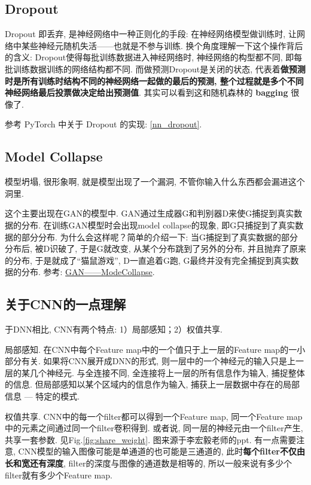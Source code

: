 \subsection{Dropout}
Dropout 即丢弃, 是神经网络中一种正则化的手段: 在神经网络模型做训练时, 让网络中某些神经元随机失活——也就是不参与训练. 换个角度理解一下这个操作背后的含义: Dropout使得每批训练数据进入神经网络时, 神经网络的构型都不同, 即每批训练数据训练的网络结构都不同. 而做预测Dropout是关闭的状态, 代表着\textbf{做预测时是所有训练时结构不同的神经网络一起做的最后的预测, 整个过程就是多个不同神经网络最后投票做决定给出预测值}. 其实可以看到这和随机森林的 \textbf{bagging} 很像了. 

参考 PyTorch 中关于 Dropout 的实现: \ref{nn_dropout}. 

\subsection{Model Collapse}
模型坍塌, 很形象啊, 就是模型出现了一个漏洞, 不管你输入什么东西都会漏进这个洞里. 

这个主要出现在GAN的模型中. GAN通过生成器G和判别器D来使G捕捉到真实数据的分布. 在训练GAN模型时会出现model collapse的现象, 即G只捕捉到了真实数据的部分分布. 为什么会这样呢？简单的介绍一下: 当G捕捉到了真实数据的部分分布后, 被D识破了, 于是G就改变, 从某个分布跳到了另外的分布, 并且抛弃了原来的分布, 于是就成了“猫鼠游戏”, D一直追着G跑, G最终并没有完全捕捉到真实数据的分布. 参考: \href{https://blog.csdn.net/SPARKKKK/article/details/72598041}{GAN——ModeCollapse}. 


\subsection{关于CNN的一点理解}
于DNN相比, CNN有两个特点: 1）局部感知；2）权值共享. 

局部感知. 在CNN中每个Feature map中的一个值只于上一层的Feature map的一小部分有关. 如果将CNN展开成DNN的形式, 则一层中的一个神经元的输入只是上一层的某几个神经元. 与全连接不同, 全连接将上一层的所有信息作为输入, 捕捉整体的信息. 但局部感知以某个区域内的信息作为输入, 捕获上一层数据中存在的局部信息 --- 特定的模式. 

权值共享. CNN中的每一个filter都可以得到一个Feature map, 同一个Feature map中的元素之间通过同一个filter卷积得到. 或者说, 同一层的神经元由一个filter产生, 共享一套参数. 
见Fig.\ref{fig:share_weight}. 图来源于李宏毅老师的ppt. 有一点需要注意, CNN模型的输入图像可能是单通道的也可能是三通道的, 此时\textbf{每个filter不仅由长和宽还有深度}, filter的深度与图像的通道数是相等的, 所以一般来说有多少个filter就有多少个Feature map. 

